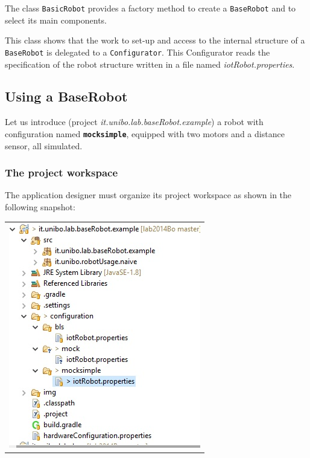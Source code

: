 The class \texttt{BasicRobot} provides a factory method to create a \texttt{BaseRobot} and to select its main components.



This class shows that the work to set-up and access to the internal structure of a \texttt{BaseRobot} is delegated to a  \texttt{Configurator}. This Configurator reads the specification of the robot structure written in a file named \textit{iotRobot.properties}.   



\subsection{Using a BaseRobot}

Let us introduce (project \textit{it.unibo.lab.baseRobot.example}) a robot with configuration named \texttt{\textbf{mocksimple}}, equipped with two motors and a distance sensor, all simulated. 

\subsubsection{The project workspace}

The application designer must organize its project workspace as shown in the following snapshot:

\begin{center}
\begin{tabular}{ c }
     \includegraphics[scale = 0.7]{./img/baseRobotProject.jpg}\\
\end{tabular} 
\end{center}

